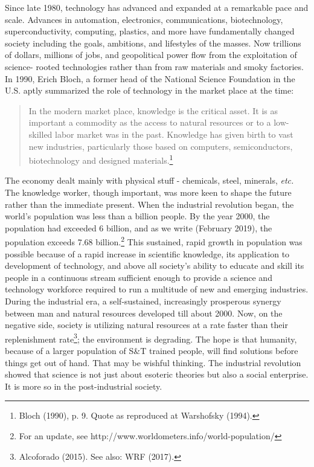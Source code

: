 \begin{multicols}{2}
Since late 1980, technology has advanced and expanded at a remarkable pace and scale. Advances in automation, electronics, communications, biotechnology, superconductivity, computing, plastics, and more have fundamentally changed society including the goals, ambitions, and lifestyles of the masses. Now trillions of dollars, millions of jobs, and geopolitical power flow from the exploitation of science- rooted technologies rather than from raw materials and smoky factories. In 1990, Erich Bloch, a former head of the National Science Foundation in the U.S. aptly summarized the role of technology in the market place at the time:
\begin{quote}
In the modern market place, knowledge is the critical asset. It is as important a commodity as the access to natural resources or to a low-skilled labor market was in the past. Knowledge has given birth to vast new industries, particularly those based on computers, semiconductors, biotechnology and designed materials.\footnote{Bloch (1990), p. 9. Quote as reproduced at Warshofsky (1994).}
\end{quote}

The economy dealt mainly with physical stuff - chemicals, steel, minerals, \textit{etc.} The knowledge worker, though important, was more keen to shape the future rather than the immediate present. When the industrial revolution began, the world's population was less than a billion people. By the year 2000, the population had exceeded 6 billion, and as we write (February 2019), the population exceeds 7.68 billion.\footnote{For an update, see http://www.worldometers.info/world-population/} This sustained, rapid growth in population was possible because of a rapid increase in scientific knowledge, its application to development of technology, and above all society's ability to educate and skill its people in a continuous stream sufficient enough to provide a science and technology workforce required to run a multitude of new and emerging industries. During the industrial era, a self-sustained, increasingly prosperous synergy between man and natural resources developed till about 2000. Now, on the negative side, society is utilizing natural resources at a rate faster than their replenishment rate\footnote{Alcoforado (2015). See also: WRF (2017).}; the environment is degrading. The hope is that humanity, because of a larger population of S\&T trained people, will find solutions before things get out of hand. That may be wishful thinking. The industrial revolution showed that science is not just about esoteric theories but also a social enterprise. It is more so in the post-industrial society.


\end{multicols}
